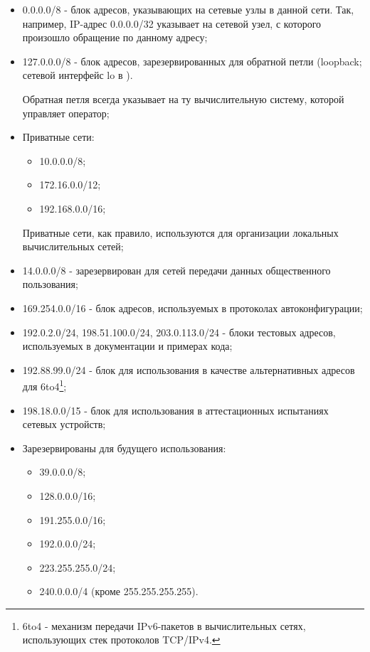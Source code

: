 	\begin{itemize}
		
		\item 0.0.0.0/8	- блок адресов, указывающих на сетевые узлы в данной сети. Так, например, IP-адрес 0.0.0.0/32 указывает на сетевой узел,
		с которого произошло обращение по данному адресу;

		\item 127.0.0.0/8 - блок адресов, зарезервированных для обратной петли (loopback; сетевой интерфейс lo в \linux).

			Обратная петля всегда указывает на ту вычислительную систему, которой управляет оператор;

		\item Приватные сети:

			\begin{itemize}

				\item 10.0.0.0/8;
				\item 172.16.0.0/12;
				\item 192.168.0.0/16;

			\end{itemize}

			Приватные сети, как правило, используются для организации локальных вычислительных сетей;

		\item 14.0.0.0/8 - зарезервирован для сетей передачи данных общественного пользования;
		\item 169.254.0.0/16 - блок адресов, используемых в протоколах автоконфигурации;
		\item 192.0.2.0/24, 198.51.100.0/24, 203.0.113.0/24 - блоки тестовых адресов, используемых в документации и примерах кода;
		\item 192.88.99.0/24 - блок для использования в качестве альтернативных адресов для 6to4\footnote{6to4 - механизм передачи IPv6-пакетов в
		вычислительных сетях, использующих стек протоколов TCP/IPv4.};
		\item 198.18.0.0/15	- блок для использования в аттестационных испытаниях сетевых устройств;

		\item Зарезервированы для будущего использования:

			\begin{itemize}

				\item 39.0.0.0/8;
				\item 128.0.0.0/16;
				\item 191.255.0.0/16;
				\item 192.0.0.0/24;
				\item 223.255.255.0/24;
				\item 240.0.0.0/4 (кроме 255.255.255.255).

			\end{itemize}

	\end{itemize}

